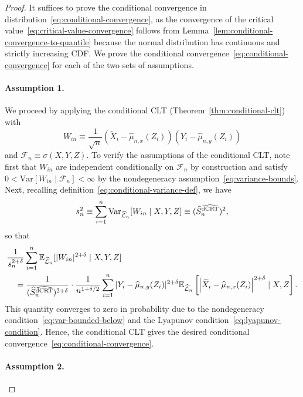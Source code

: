 \documentclass[12pt]{article}
\theoremstyle{definition}
\theoremstyle{remark}
\newcommand{\E}{\mathbb E}								%
\newcommand{\V}{\mathrm{Var}}							%
\newcommand{\srx}{X}									%
\newcommand{\srz}{Z}									%
\newcommand{\srxk}{\widetilde X}						%
\newcommand{\sry}{Y}									%
\newcommand{\lawhat}{\widehat{\mathcal L}}				%
\newcommand{\dCRThat}{\widehat{\textnormal{dCRT}}}		%
\begin{document}
\begin{proof}

It suffices to prove the conditional convergence in distribution~\eqref{eq:conditional-convergence}, as the convergence of the critical value~\eqref{eq:critical-value-convergence} follows from Lemma~\ref{lem:conditional-convergence-to-quantile} because the normal distribution has continuous and strictly increasing CDF. We prove the conditional convergence~\eqref{eq:conditional-convergence} for each of the two sets of assumptions.

\paragraph{Assumption 1.}

We proceed by applying the conditional CLT (Theorem~\ref{thm:conditional-clt}) with 
\begin{equation}
W_{in} \equiv \frac{1}{\sqrt{n}}(\srxk_i - \widehat \mu_{n,x}(\srz_i))(\sry_i - \widehat \mu_{n,y}(\srz_i))
\end{equation}
and $\mathcal F_n \equiv \sigma(\srx, \sry, \srz)$. To verify the assumptions of the conditional CLT, note first that $W_{in}$ are independent conditionally on $\mathcal F_n$ by construction and satisfy $0 < \V[W_{in} \mid \mathcal F_n] < \infty$ by the nondegeneracy assumption~\eqref{eq:variance-bounds}. Next, recalling definition~\eqref{eq:conditional-variance-def}, we have
\begin{equation*}
s^2_n \equiv \sum_{i = 1}^n \V_{\lawhat_n}[W_{in}\mid \srx,\sry,\srz] \equiv (\widehat S_n^{\dCRThat})^2,
\end{equation*}
so that
\begin{align*}
		&\frac{1}{s_n^{2+\delta}} \sum_{i = 1}^n \E_{\lawhat_n}[|W_{in}|^{2+\delta} \mid \srx,\sry,\srz] \\
		&\quad= \frac{1}{(\widehat S_n^{\dCRThat})^{2+\delta}} \cdot \frac{1}{n^{1+\delta/2}} \sum_{i=1}^n |\sry_i-\widehat\mu_{n,y}(\srz_i)|^{2+\delta}\E_{\lawhat_n}\left[\left|\srxk_i-\widehat\mu_{n,x}(\srz_i)\right|^{2+\delta}\mid \srx,\srz\right].
\end{align*}
This quantity converges to zero in probability due to the nondegeneracy condition~\eqref{eq:var-bounded-below} and the Lyapunov condition~\eqref{eq:lyapunov-condition}. Hence, the conditional CLT gives the desired conditional convergence~\eqref{eq:conditional-convergence}.
 
 \paragraph{Assumption 2.}


\end{proof}
\end{document}
